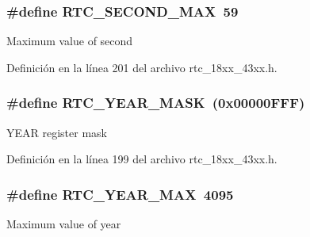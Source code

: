 \subsubsection[{\texorpdfstring{R\+T\+C\+\_\+\+S\+E\+C\+O\+N\+D\+\_\+\+M\+AX}{RTC_SECOND_MAX}}]{\setlength{\rightskip}{0pt plus 5cm}\#define R\+T\+C\+\_\+\+S\+E\+C\+O\+N\+D\+\_\+\+M\+AX~59}\hypertarget{group___r_t_c__18_x_x__43_x_x_ga60bbeee3abbb647a0daa7c2130965646}{}\label{group___r_t_c__18_x_x__43_x_x_ga60bbeee3abbb647a0daa7c2130965646}
Maximum value of second 

Definición en la línea 201 del archivo rtc\+\_\+18xx\+\_\+43xx.\+h.

\subsubsection[{\texorpdfstring{R\+T\+C\+\_\+\+Y\+E\+A\+R\+\_\+\+M\+A\+SK}{RTC_YEAR_MASK}}]{\setlength{\rightskip}{0pt plus 5cm}\#define R\+T\+C\+\_\+\+Y\+E\+A\+R\+\_\+\+M\+A\+SK~(0x00000\+F\+F\+F)}\hypertarget{group___r_t_c__18_x_x__43_x_x_ga35a455a48ccdb557b824e87701449c76}{}\label{group___r_t_c__18_x_x__43_x_x_ga35a455a48ccdb557b824e87701449c76}
Y\+E\+AR register mask 

Definición en la línea 199 del archivo rtc\+\_\+18xx\+\_\+43xx.\+h.

\subsubsection[{\texorpdfstring{R\+T\+C\+\_\+\+Y\+E\+A\+R\+\_\+\+M\+AX}{RTC_YEAR_MAX}}]{\setlength{\rightskip}{0pt plus 5cm}\#define R\+T\+C\+\_\+\+Y\+E\+A\+R\+\_\+\+M\+AX~4095}\hypertarget{group___r_t_c__18_x_x__43_x_x_ga72b68660aec4a924c12a124e2ec5f852}{}\label{group___r_t_c__18_x_x__43_x_x_ga72b68660aec4a924c12a124e2ec5f852}
Maximum value of year 

